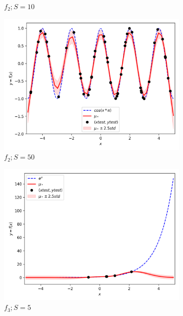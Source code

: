 \documentclass{article}
\begin{document}
\begin{figure}
\begin{subfigure}{.33\textwidth}
  \caption{$f_2; S = 10$}
\end{subfigure}
\begin{subfigure}{.33\textwidth}
  \centering
  \includegraphics[width=\linewidth]{train_size/func2_50.png}
  \caption{$f_2; S = 50$}
\end{subfigure}
\begin{subfigure}{.33\textwidth}
  \centering
  \includegraphics[width=\linewidth]{train_size/func3_5.png}
  \caption{$f_3; S = 5$}
\end{subfigure}
\begin{subfigure}{.33\textwidth}
  \centering

\end{subfigure}
\end{figure}
\end{document}
